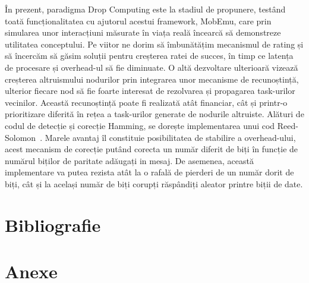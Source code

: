 \documentclass[12pt,a4paper]{report}
\begin{document}
În prezent, paradigma Drop Computing este la stadiul de propunere, testând toată funcționalitatea cu ajutorul acestui framework, MobEmu, care prin simularea unor interacțiuni măsurate în viața reală încearcă să demonstreze utilitatea conceptului. Pe viitor ne dorim să îmbunătățim mecanismul de rating și să încercăm să găsim soluții pentru creșterea ratei de succes, în timp ce latența de procesare și overhead-ul să fie diminuate. O altă dezvoltare ulterioară vizează creșterea altruismului nodurilor prin integrarea unor mecanisme de recunoștință, ulterior fiecare nod să fie foarte interesat de rezolvarea și propagarea task-urilor vecinilor. Această recunoștință poate fi realizată atât financiar, cât și printr-o prioritizare diferită în rețea a task-urilor generate de nodurile altruiste.
Alături de codul de detecție și corecție Hamming, se dorește implementarea unui cod Reed-Solomon~\cite{reedSolomon}. Marele avantaj îl constituie posibilitatea de stabilire a overhead-ului, acest mecanism de corecție putând corecta un număr diferit de biți în funcție de numărul biților de paritate adăugați in mesaj. De asemenea, această implementare va putea rezista atât la o rafală de pierderi de un număr dorit de biți, cât și la același număr de biți corupți răspândiți aleator printre biții de date.


\chapter{Bibliografie} \label{bibliografie}





\chapter{Anexe} \label{anexe}
\newlength\someheight
\setlength\someheight{3cm}
\end{document}
